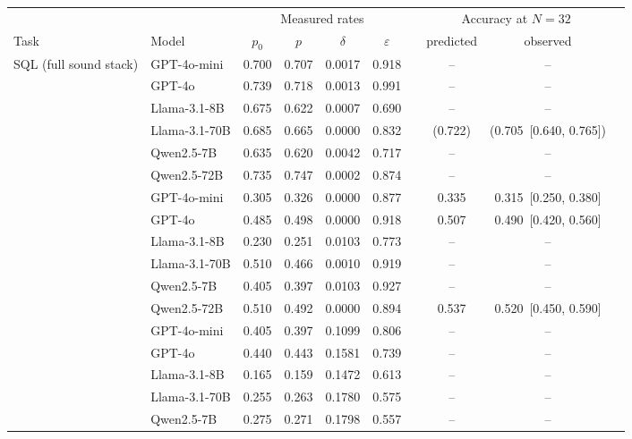 \documentclass[11pt]{article}
\begin{document}
\begin{table}[t]\centering\small
\begin{threeparttable}
\scriptsize
\setlength{\tabcolsep}{1.6pt}
\begin{tabular}{@{}ll cccc c cc c@{}}
\toprule
& & \multicolumn{4}{c}{Measured rates} & & \multicolumn{2}{c}{Accuracy at $N{=}32$} & \\
\cmidrule(lr){3-6}\cmidrule(lr){8-9}
Task & Model & $p_0$ & $p$ & $\delta$\tnote{a} & $\varepsilon$\tnote{b} & &
  predicted\tnote{c} & observed\tnote{e}  \\
\midrule
\multirow{6}{*}{SQL (full sound stack)}
  & GPT-4o-mini   & 0.700 & 0.707 & 0.0017 & 0.918 & & {--} & {--} \\
  & GPT-4o        & 0.739 & 0.718 & 0.0013 & 0.991 & & {--} & {--} \\
  & Llama-3.1-8B  & 0.675 & 0.622 & 0.0007 & 0.690 & & {--} & {--} \\
  & Llama-3.1-70B & 0.685 & 0.665 & 0.0000\tnote{u} & 0.832 & & (0.722) & (0.705~[0.640, 0.765]) \\
  & Qwen2.5-7B    & 0.635 & 0.620 & 0.0042 & 0.717 & & {--} & {--} \\
  & Qwen2.5-72B   & 0.735 & 0.747 & 0.0002 & 0.874 & & {--} & {--} \\
\addlinespace
\multirow{6}{*}{IE (full sound stack)}
  & GPT-4o-mini   & 0.305 & 0.326 & 0.0000 & 0.877 & & 0.335 & 0.315~[0.250, 0.380] \\
  & GPT-4o        & 0.485 & 0.498 & 0.0000 & 0.918 & & 0.507 & 0.490~[0.420, 0.560] \\
  & Llama-3.1-8B  & 0.230 & 0.251 & 0.0103 & 0.773 & & {--} & {--} \\
  & Llama-3.1-70B & 0.510 & 0.466 & 0.0010 & 0.919 & & {--} & {--} \\
  & Qwen2.5-7B    & 0.405 & 0.397 & 0.0103 & 0.927 & & {--} & {--} \\
  & Qwen2.5-72B   & 0.510 & 0.492 & 0.0000 & 0.894 & & 0.537 & 0.520~[0.450, 0.590] \\
\addlinespace
\multirow{6}{*}{Morph.\ (full sound stack)}
  & GPT-4o-mini   & 0.405 & 0.397 & 0.1099 & 0.806 & & {--} & {--} \\
  & GPT-4o        & 0.440 & 0.443 & 0.1581 & 0.739 & & {--} & {--} \\
  & Llama-3.1-8B  & 0.165 & 0.159 & 0.1472 & 0.613 & & {--} & {--} \\
  & Llama-3.1-70B & 0.255 & 0.263 & 0.1780 & 0.575 & & {--} & {--} \\
  & Qwen2.5-7B    & 0.275 & 0.271 & 0.1798 & 0.557 & & {--} & {--} \\

\end{tabular}
\end{threeparttable}
\end{table}
\end{document}
